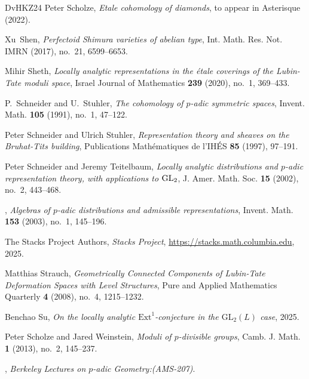 \documentclass{article}
\theoremstyle{definition}
\begin{document}
\begin{thebibliography}{DvHKZ24}
Peter Scholze, \emph{Etale cohomology of diamonds}, to appear in Asterisque (2022).

Xu~Shen, \emph{Perfectoid {S}himura varieties of abelian type}, Int. Math. Res. Not. IMRN (2017), no.~21, 6599--6653. 

Mihir Sheth, \emph{{Locally analytic representations in the {\'e}tale coverings of the Lubin-Tate moduli space}}, Israel Journal of Mathematics \textbf{239} (2020), no.~1, 369--433.

P.~Schneider and U.~Stuhler, \emph{The cohomology of {$p$}-adic symmetric spaces}, Invent. Math. \textbf{105} (1991), no.~1, 47--122. 

Peter Schneider and Ulrich Stuhler, \emph{{Representation theory and sheaves on the Bruhat-Tits building}}, Publications Math{\'e}matiques de l'IH{\'E}S \textbf{85} (1997), 97--191.

Peter Schneider and Jeremy Teitelbaum, \emph{Locally analytic distributions and {$p$}-adic representation theory, with applications to {${\rm GL}_2$}}, J. Amer. Math. Soc. \textbf{15} (2002), no.~2, 443--468. 

\bysame, \emph{Algebras of {$p$}-adic distributions and admissible representations}, Invent. Math. \textbf{153} (2003), no.~1, 145--196. 

The {Stacks Project Authors}, \emph{\textit{Stacks Project}}, \url{https://stacks.math.columbia.edu}, 2025.

Matthias Strauch, \emph{{Geometrically Connected Components of Lubin-Tate Deformation Spaces with Level Structures}}, Pure and Applied Mathematics Quarterly \textbf{4} (2008), no.~4, 1215--1232.

Benchao Su, \emph{{On the locally analytic $\mathrm{Ext}^1$-conjecture in the $\mathrm{GL}_2(L)$ case}}, 2025.

Peter Scholze and Jared Weinstein, \emph{Moduli of {$p$}-divisible groups}, Camb. J. Math. \textbf{1} (2013), no.~2, 145--237. 

\bysame, \emph{{Berkeley Lectures on $p$-adic Geometry:(AMS-207)}}.


\end{thebibliography}
\end{document}
